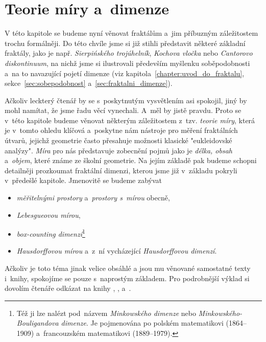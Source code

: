 \chapter{Teorie míry a~dimenze}\label{chapter:teorie-miry-a-dimenze}

V této kapitole se budeme nyní věnovat fraktálům a~jim příbuzným záležitostem trochu formálněji. Do této chvíle jsme si již stihli představit některé základní fraktály, jako je např. \emph{Sierpińského trojúhelník}, \emph{Kochova vločka} nebo \emph{Cantorovo diskontinuum}, na nichž jsme si ilustrovali především myšlenku soběpodobnosti a~na to navazující pojetí dimenze (viz kapitola~\ref{chapter:uvod_do_fraktalu}, sekce~\ref{sec:sobepodobnost} a~\ref{sec:fraktalni_dimenze}).

Ačkoliv leckterý čtenář by se s~poskytnutým vysvětlením asi spokojil, jiný by mohl namítat, že jsme řadu věcí vynechali. A~měl by jistě pravdu. Proto se v~této kapitole budeme věnovat některým záležitostem z~tzv. \emph{teorie míry}, která je v~tomto ohledu klíčová a~poskytne nám nástroje pro měření fraktálních útvarů, jejichž geometrie často přesahuje možnosti klasické "eukleidovské analýzy". \emph{Míra} pro nás představuje zobecnění pojmů jako je \emph{délka, obsah} a~\emph{objem}, které známe ze školní geometrie. Na jejím základě pak budeme schopni detailněji prozkoumat fraktální dimenzi, kterou jsme již v~základu pokryli v~předešlé kapitole. Jmenovitě se budeme zabývat
\begin{itemize}
    \item \emph{měřitelnými prostory} a~\emph{prostory s~mírou} obecně,
    \item \emph{Lebesgueovou mírou},
    \item \emph{box-counting dimenzí}\footnote{Též ji lze nalézt pod~názvem \emph{Minkowského dimenze} nebo \emph{Minkowského-Bouligandova dimenze}. Je pojmenována po polském matematikovi  (1864--1909) a~francouzském matematikovi  (1889--1979).}
    \item \emph{Hausdorffovou mírou} a~z~ní vycházející \emph{Hausdorffovou dimenzí}.
\end{itemize}

Ačkoliv je toto téma jinak velice obsáhlé a jsou mu věnované samostatné texty i~knihy, spokojíme se pouze s~naprostým základem. Pro podrobnější výklad si dovolím čtenáře odkázat na knihy \cite{Falconer2014}, \cite{Lukes2013}, \cite{NetukaIntegral2016} a~\cite{Edgar2008}.

